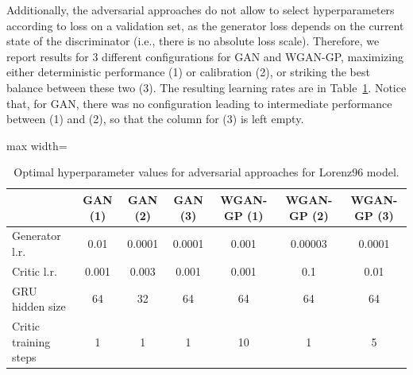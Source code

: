 \documentclass[twoside,11pt]{article}
\begin{document}
	Additionally, the adversarial approaches do not allow to select hyperparameters according to loss on a validation set, as the generator loss depends on the current state of the discriminator (i.e., there is no absolute loss scale). Therefore, we report results for 3 different configurations for GAN and WGAN-GP, maximizing either deterministic performance (1) or calibration (2), or striking the best balance between these two (3). The resulting learning rates are in Table~\ref{tab:lr_lorenz96_GAN}. Notice that, for GAN, there was no configuration leading to intermediate performance between (1) and (2), so that the column for (3) is left empty.
	
	\begin{table}
		\begin{center}
			\begin{adjustbox}{max width=\textwidth}
				\begin{tabular}{lcccccc}
					\toprule
					& GAN (1) & GAN (2) & GAN (3) & WGAN-GP (1) & WGAN-GP (2) & WGAN-GP (3) \\
					\midrule
					Generator  l.r. & 0.01 & 0.0001 & 0.0001 & 0.001& 0.00003 & 0.0001 \\
					Critic l.r. & 0.001 & 0.003 & 0.001 & 0.001 &0.1 &0.01 \\
					GRU hidden size & 64 & 32 & 64& 64 & 64 & 64 \\
					Critic training steps & 1 & 1& 1 & 10 & 1 & 5 \\
					\bottomrule
				\end{tabular}
			\end{adjustbox}
		\end{center}
		\caption{Optimal hyperparameter values for adversarial approaches for Lorenz96 model.}
		\label{tab:lr_lorenz96_GAN}
	\end{table}
\end{document}
